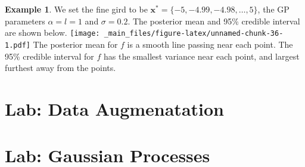 \documentclass[
]{book}
\theoremstyle{definition}
\theoremstyle{definition}
\newtheorem{example}{Example}[chapter]
\theoremstyle{definition}
\theoremstyle{definition}
\theoremstyle{remark}
\begin{document}
\begin{example}
We set the fine gird to be \(\boldsymbol{x}^* = \{-5, -4.99, -4.98, \ldots, 5\}\), the GP parameters \(\alpha = l = 1\) and \(\sigma = 0.2\). The posterior mean and 95\% credible interval are shown below.
\texttt{[image: \_main\_files/figure-latex/unnamed-chunk-36-1.pdf]}
The posterior mean for \(f\) is a smooth line passing near each point. The 95\% credible interval for \(f\) has the smallest variance near each point, and largest furthest away from the points.
\end{example}

\hypertarget{lab-data-augmenatation}{%
\section{Lab: Data Augmenatation}\label{lab-data-augmenatation}}

\hypertarget{lab-gaussian-processes}{%
\section{Lab: Gaussian Processes}\label{lab-gaussian-processes}}

  
\end{document}
